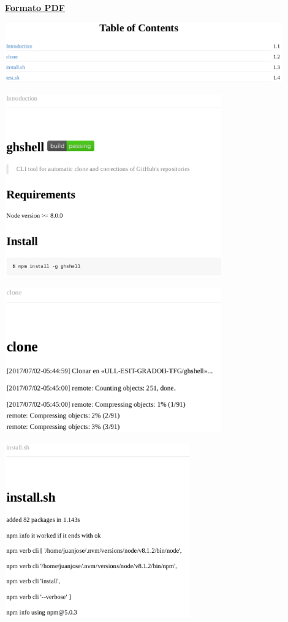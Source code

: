 \documentclass{beamer}
\begin{document}
\begin{frame}[allowframebreaks]
  \underline{{\bfseries Formato PDF}}
  	
  \begin{center}
  	\includegraphics[width=0.9\textwidth]{images/ghshell8-6b.eps}
  	\framebreak
 	
  	\includegraphics[width=0.7\textwidth]{images/ghshell8-7.eps}
  	\framebreak

  	\includegraphics[width=0.7\textwidth]{images/ghshell8-8.eps}
  	\framebreak

	\includegraphics[width=0.6\textwidth]{images/ghshell8-9.eps}
  	\framebreak
  	

\end{center}
\end{frame}
\end{document}
